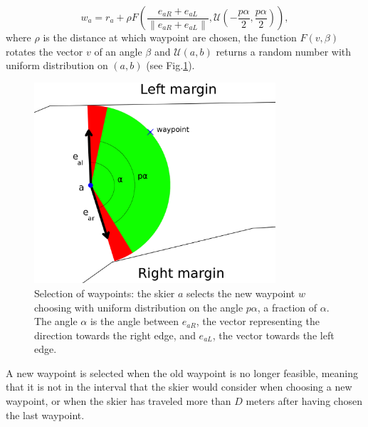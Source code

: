 \documentclass[12pt,a4paper,twoside]{book}
\newcommand{\norm}[1]{\lVert#1\rVert}
\begin{document}
\begin{equation}\label{new_waypoint}
w_a=r_a+\rho F\left(\frac{e_{aR}+e_{aL}}{\norm{e_{aR}+e_{aL}}},\mathcal{U}\left(-\frac{p \alpha}{2},\frac{p \alpha}{2}\right)\right),
\end{equation}
where $\rho$ is the distance at which waypoint are chosen, the function $F\left(v,\beta\right)$ rotates the vector $v$ of an angle $\beta$ and $\mathcal{U}(a,b)$ returns a random number with uniform distribution on $(a,b)$ (see Fig.\ref{new_waypoint_pic}).

\begin{figure}[!h]
  \begin{center}
    \includegraphics[width=0.8\textwidth]{images/waypoint_new.eps}
    \caption{Selection of waypoints: the skier $a$ selects the new waypoint $w$ choosing with uniform distribution on the angle $p\alpha$, a fraction of $\alpha$. The angle $\alpha$ is the angle between $e_{aR}$, the vector representing the direction towards the right edge, and $e_{aL}$, the vector towards the left edge.}\label{new_waypoint_pic}
  \end{center}
\end{figure}

A new waypoint is selected when the old waypoint is no longer feasible, meaning that it is not in the interval that the skier would consider when choosing a new waypoint, or when the skier has traveled more than $D$ meters after having chosen the last waypoint.
\end{document}
